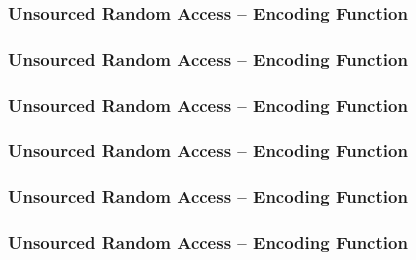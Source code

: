 
\begin{frame} \frametitle{Unsourced Random Access -- Encoding Function}
\begin{center}  \end{center}
\end{frame}


\begin{frame} \frametitle{Unsourced Random Access -- Encoding Function}
\begin{center}  \end{center}
\end{frame}


\begin{frame} \frametitle{Unsourced Random Access -- Encoding Function}
\begin{center}  \end{center}
\end{frame}


\begin{frame} \frametitle{Unsourced Random Access -- Encoding Function}
\begin{center}  \end{center}
\end{frame}


\begin{frame} \frametitle{Unsourced Random Access -- Encoding Function}
\begin{center}  \end{center}
\end{frame}


\begin{frame} \frametitle{Unsourced Random Access -- Encoding Function}
\begin{center}  \end{center}
\end{frame}


